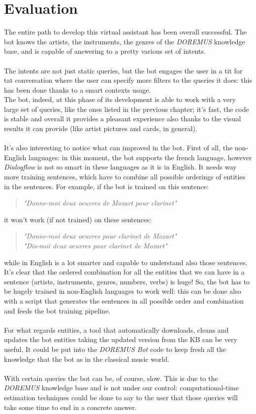 \documentclass[a4paper,12pt]{report}
\begin{document}
	\chapter{Evaluation}
	The entire path to develop this virtual assistant has been overall successful. The bot knows the artists, the instruments, the genres of the \textit{DOREMUS} knowledge base, and is capable of answering to a pretty various set of intents.\\\\
	The intents are not just static queries, but the bot engages the user in a tit for tat conversation where the user can specify more filters to the queries it does: this has been done thanks to a smart contexts usage.\\
	The bot, indeed, at this phase of its development is able to work with a very large set of queries, like the ones listed in the previous chapter; it's fast, the code is stable and overall it provides a pleasant experience also thanks to the visual results it can provide (like artist pictures and cards, in general).\\\\
	It's also interesting to notice what can improved in the bot. First of all, the non-English languages: in this moment, the bot supports the french language, however \textit{Dialogflow} is not so smart in these languages as it is in English. It needs way more training sentences, which have to combine all possible orderings of entities in the sentences. For example, if the bot is trained on this sentence:
	\begin{verse}
		\textit{"Donne-moi deux oeuvres de Mozart pour clarinet"}
	\end{verse}
	it won't work (if not trained) on these sentences:
	\begin{verse}
		\textit{"Donne-moi deux oeuvres pour clarinet de Mozart"}\\
		\textit{"Dis-moi deux oeuvres pour clarinet de Mozart"}
	\end{verse}
	while in English is a lot smarter and capable to understand also those sentences. It's clear that the ordered combination for all the entities that we can have in a sentence (artists, instruments, genres, numbers, verbs) is huge! So, the bot has to be hugely trained in non-English languages to work well: this can be done also with a script that generates the sentences in all possible order and combination and feeds the bot training pipeline.\\\\
	For what regards entities, a tool that automatically downloads, cleans and updates the bot entities taking the updated version from the KB can be very useful. It could be put into the \textit{DOREMUS Bot} code to keep fresh all the knowledge that the bot as in the classical music world.\\\\
	With certain queries the bot can be, of course, slow. This is due to the \textit{DOREMUS} knowledge base and is not under our control: computational-time estimation techniques could be done to say to the user that those queries will take some time to end in a concrete answer.
	
\end{document}
